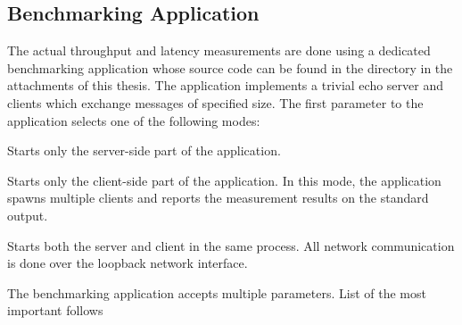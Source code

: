



\subsection{Benchmarking Application}\label{sec:04-benchmark-app}

The actual throughput and latency measurements are done using a dedicated benchmarking \dotnet{}
application whose source code can be found in the
 directory in the attachments of this thesis.
The application implements a trivial echo server and clients which exchange messages of specified
size. The first parameter to the application selects one of the following modes:

\begin{description}

   Starts only the server-side part of the application.

   Starts only the client-side part of the application. In this mode, the
application spawns multiple clients and reports the measurement results on the standard output.

   Starts both the server and client in the same process. All network
communication is done over the loopback network interface.

\end{description}

The benchmarking application accepts multiple parameters. List of the most important follows

